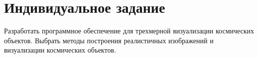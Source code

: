 \newpage
\chapter*{Индивидуальное задание}
Разработать программное обеспечение для трехмерной визуализации космических объектов. Выбрать методы построения реалистичных изображений и визуализации космических объектов.

